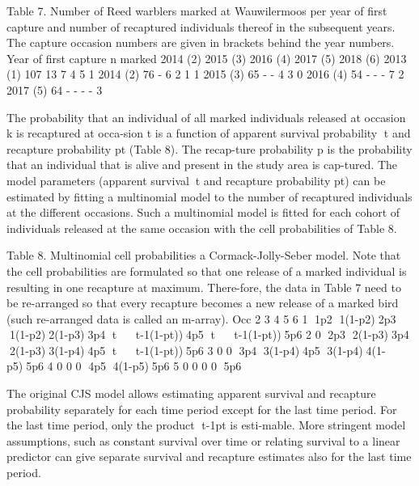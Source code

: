 \documentclass[
]{book}
\begin{document}
Table 7. Number of Reed warblers marked at Wauwilermoos per year of first capture and number of recaptured individuals thereof in the subsequent years. The capture occasion numbers are given in brackets behind the year numbers.
Year of first capture n marked 2014 (2) 2015 (3) 2016 (4) 2017 (5) 2018 (6)
2013 (1) 107 13 7 4 5 1
2014 (2) 76 - 6 2 1 1
2015 (3) 65 - - 4 3 0
2016 (4) 54 - - - 7 2
2017 (5) 64 - - - - 3

The probability that an individual of all marked individuals released at occasion k is recaptured at occa-sion t is a function of apparent survival probability t and recapture probability pt (Table 8). The recap-ture probability p is the probability that an individual that is alive and present in the study area is cap-tured. The model parameters (apparent survivalt and recapture probability pt) can be estimated by fitting a multinomial model to the number of recaptured individuals at the different occasions. Such a multinomial model is fitted for each cohort of individuals released at the same occasion with the cell probabilities of Table 8.

Table 8. Multinomial cell probabilities a Cormack-Jolly-Seber model. Note that the cell probabilities are formulated so that one release of a marked individual is resulting in one recapture at maximum. There-fore, the data in Table 7 need to be re-arranged so that every recapture becomes a new release of a marked bird (such re-arranged data is called an m-array).
Occ 2 3 4 5 6
1 1p2 1(1-p2)2p3 1(1-p2)2(1-p3)3p4 tt-1(1-pt))4p5 tt-1(1-pt))5p6
2 0 2p3 2(1-p3)3p4 2(1-p3)3(1-p4)4p5 tt-1(1-pt))5p6
3 0 0 3p4 3(1-p4)4p5 3(1-p4)4(1-p5)5p6
4 0 0 0 4p5 4(1-p5)5p6
5 0 0 0 0 5p6

The original CJS model allows estimating apparent survival and recapture probability separately for each time period except for the last time period. For the last time period, only the product t-1pt is esti-mable. More stringent model assumptions, such as constant survival over time or relating survival to a linear predictor can give separate survival and recapture estimates also for the last time period.
\end{document}
